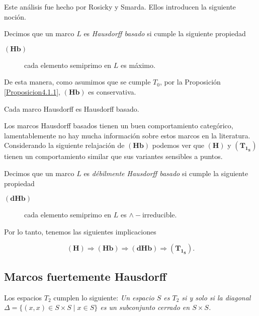 \documentclass{comunicaciones}
\begin{document}
Este análisis fue hecho por Rosicky y Smarda. Ellos introducen la siguiente noción.

\begin{dfn}
    Decimos que un marco $L$ es \emph{Hausdorff basado} si cumple la siguiente propiedad
    \begin{description}
        \item[$\mathbf{(Hb)}$] cada elemento semiprimo en $L$ es máximo. 
    \end{description}
\end{dfn}

De esta manera, como asumimos que se cumple $T_0$, por la Proposición \ref{Proposicion4.1.1}, $\mathbf{(Hb)}$ es conservativa.

\begin{prop}\label{Proposición4.2}
    Cada marco Hausdorff es Hausdorff basado.
\end{prop}

Los marcos Hausdorff basados tienen un buen comportamiento categórico, lamentablemente no hay mucha información sobre estos marcos en la literatura.\\

Considerando la siguiente relajación de $\mathbf{(Hb)}$ podemos ver que $\mathbf{(H)}$ y $\mathbf{(T_{1_S})}$ tienen un comportamiento similar que sus variantes sensibles a puntos.

\begin{dfn}\label{DHausdorffbasado}
    Decimos que un marco $L$ es \emph{débilmente Hausdorff basado} si cumple la siguiente propiedad
    \begin{description}
        \item[$\mathbf{(dHb)}$] cada elemento semiprimo en $L$ es $\wedge-$irreducible. 
    \end{description}
\end{dfn}

Por lo tanto, tenemos las siguientes implicaciones

\[
\mathbf{(H)}\Rightarrow \mathbf{(Hb)}\Rightarrow \mathbf{(dHb)}\Rightarrow \mathbf{(T_{1_S})}.
\]

\subsection{Marcos fuertemente Hausdorff}

Los espacios $T_2$ cumplen lo siguiente: \emph{Un espacio $S$ es $T_2$ si y solo si la diagonal $\Delta=\{(x,x)\in S\times S\mid x\in S\}$ es un subconjunto cerrado en $S\times S$.}\\
\end{document}
